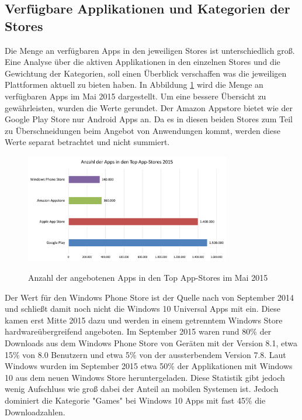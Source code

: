 \subsection{Verfügbare Applikationen und Kategorien der Stores}
Die Menge an verfügbaren Apps in den jeweiligen Stores ist unterschiedlich groß.
Eine Analyse über die aktiven Applikationen in den einzelnen Stores und die Gewichtung der Kategorien, soll einen Überblick verschaffen was die jeweiligen Plattformen aktuell zu bieten haben.
In Abbildung \ref{graph_apps_in_stores} wird die Menge an verfügbaren Apps im Mai 2015 dargestellt. Um eine bessere Übersicht zu gewährleisten, wurden die Werte gerundet. Der Amazon Appstore bietet wie der Google Play Store nur Android Apps an. Da es in diesen beiden Stores zum Teil zu Überschneidungen beim Angebot von Anwendungen kommt, werden diese Werte separat betrachtet und nicht summiert.

\begin{figure}[htbp]
	\centering
	\includegraphics[width=0.8\textwidth]{Bilder/Anzahl_der_Apps}
	\caption{Anzahl der angebotenen Apps in den Top App-Stores im Mai 2015}\label{graph_apps_in_stores}\citep{apps_in_stores}
\end{figure}

Der Wert für den Windows Phone Store ist der Quelle nach von September 2014 und schließt damit noch nicht die Windows 10 Universal Apps mit ein. Diese kamen erst Mitte 2015 dazu und werden in einem getrenntem Windows Store hardwareübergreifend angeboten. Im September 2015 waren rund 80\% der Downloads aus dem Windows Phone Store von Geräten mit der Version 8.1, etwa 15\% von 8.0 Benutzern und etwa 5\% von der aussterbendem Version 7.8.
Laut Windows wurden im September 2015 etwa 50\% der Applikationen mit Windows 10 aus dem neuen Windows Store heruntergeladen. Diese Statistik gibt jedoch wenig Aufschluss wie groß dabei der Anteil an mobilen Systemen ist. Jedoch dominiert die Kategorie "Games" bei Windows 10 Apps mit fast 45\% die Downloadzahlen.\citep{windows_store_trends_2015}

